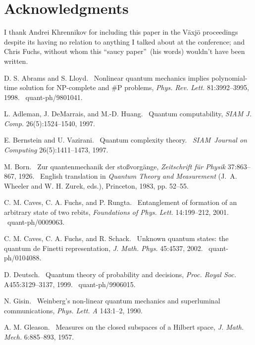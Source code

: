 \documentclass[12pt]{article}%
\begin{document}
\section*{Acknowledgments}

I thank Andrei Khrennikov for including this paper in the V\"{a}xj\"{o}
proceedings despite its having no relation to anything I talked about at the
conference; and Chris Fuchs, without whom this \textquotedblleft saucy
paper\textquotedblright\ (his words) wouldn't have been written.

\begin{thebibliography}{9}                                                                                                %

D. S. Abrams and S. Lloyd. \ Nonlinear quantum mechanics implies
polynomial-time solution for NP-complete and \#P problems, \textit{Phys. Rev.
Lett.} 81:3992--3995, 1998. \ quant-ph/9801041.

L. Adleman, J. DeMarrais, and M.-D. Huang. \ Quantum
computability, \textit{SIAM J. Comp.} 26(5):1524--1540, 1997.

E. Bernstein and U. Vazirani. \ Quantum complexity theory.
\ \textit{SIAM\ Journal on Computing} 26(5):1411--1473, 1997.

M. Born. \ Zur quantenmechanik der sto\ss vorg\"{a}nge,
\textit{Zeitschrift f\"{u}r Physik} 37:863--867, 1926. \ English translation
in \textit{Quantum Theory and Measurement} (J.\ A. Wheeler and W. H. Zurek,
eds.), Princeton, 1983, pp. 52--55.

C. M. Caves, C. A. Fuchs, and P. Rungta. \ Entanglement of
formation of an arbitrary state of two rebits, \textit{Foundations of Phys.
Lett.} 14:199--212, 2001. \ quant-ph/0009063.

C. M. Caves, C. A. Fuchs, and R. Schack. \ Unknown quantum
states: the quantum de Finetti representation, \textit{J. Math. Phys.}
45:4537, 2002. \ quant-ph/0104088.

D. Deutsch. \ Quantum theory of probability and decisions,
\textit{Proc. Royal Soc.} A455:3129--3137, 1999. \ quant-ph/9906015.

N. Gisin. \ Weinberg's non-linear quantum mechanics and
superluminal communications, \textit{Phys. Lett. A} 143:1--2, 1990.

A. M. Gleason. \ Measures on the closed subspaces of a
Hilbert space, \textit{J. Math. Mech.} 6:885--893, 1957.


\end{thebibliography}
\end{document}
